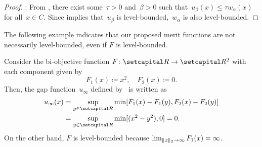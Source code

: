 \documentclass[../main]{subfiles}
\begin{document}
\begin{proof}
    : From , there exist some~$\tau > 0$ and~$\beta > 0$ such that~$u_\beta(x) \le \tau w_\alpha(x)$ for all~$x \in C$.
    Since  implies that~$u_\beta$ is level-bounded,~$w_\alpha$ is also level-bounded.
\end{proof}
The following example indicates that our proposed merit functions are not necessarily level-bounded, even if $F$ is level-bounded.
\begin{example}
    Consider the bi-objective function $F \colon \setR \to \setR^2$ with each component given by
    \begin{equation}
        F_1(x) \coloneqq x^2, \quad F_2(x) \coloneqq 0.
    \end{equation}
    Then, the gap function~$u_\infty$ defined by~ is written as
    \begin{align}
        u_\infty(x) & = \sup_{y \in \setR} \min [ F_1(x) - F_1(y), F_2(x) - F_2(y) ] \\
                    & = \sup_{y \in \setR} \min [ (x^2 - y^2), 0 ] = 0.
    \end{align}
    On the other hand, $F$ is level-bounded because $\lim_{\lVert x\rVert_2 \to \infty} F_1(x) = \infty$.
\end{example}
\end{document}
